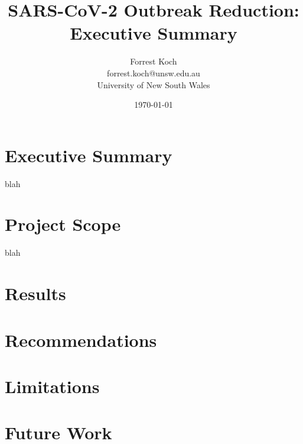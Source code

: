 \documentclass[11pt]{article}
\title{SARS-CoV-2 Outbreak Reduction: Executive Summary}
\author{
        Forrest Koch \\
        forrest.koch@unsw.edu.au \\
        University of New South Wales \\
}
\date{\today}
\newcommand{\betaEst}{0.184}
\newcommand{\RN}[1]{%
  \textup{\uppercase\expandafter{\romannumeral#1}}%
}
\begin{document}
\maketitle

\begin{abstract}
\end{abstract}

\section{Executive Summary}
blah
\section{Project Scope}
blah
\section{Results}

\section{Recommendations}

\section{Limitations}

\section{Future Work}

\end{document}
